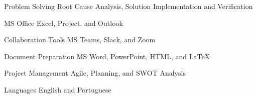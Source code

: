 


\begin{cvskills}


\cvskill
{Problem Solving} %
{Root Cause Analysis, Solution Implementation and Verification} %


\cvskill
{MS Office} %
{Excel, Project, and Outlook} %


\cvskill
{Collaboration Tools} %
{MS Teams, Slack, and Zoom} %


\cvskill
{Document Preparation} %
{MS Word, PowerPoint, HTML, and LaTeX } %


\cvskill
{Project Management} %
{Agile, Planning, and SWOT Analysis} %


\cvskill
{Languages} %
{English and Portuguese} %


\end{cvskills}
